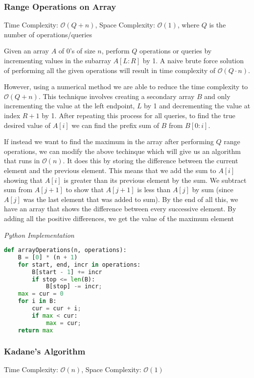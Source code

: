 \documentclass{article}
\newcommand{\bigO}{\ensuremath{\mathcal{O}}}
\begin{document}
    \subsubsection{Range Operations on Array}
    Time Complexity: $\bigO(Q + n)$, Space Complexity: $\bigO(1)$, where $Q$ is the number of operations/queries
    
    Given an array $A$ of 0's of size $n$, perform $Q$ operations or queries by incrementing values in the subarray $A[L: R]$ by 1. A naive brute force solution of performing all the given operations will result in time complexity of $\bigO(Q\cdot n)$. 
    
    However, using a numerical method we are able to reduce the time complexity to $\bigO(Q + n)$. This technique involves creating a secondary array $B$ and only incrementing the value at the left endpoint, $L$ by 1 and decrementing the value at index $R + 1$ by 1. After repeating this process for all queries, to find the true desired value of $A[i]$ we can find the prefix sum of $B$ from $B[0:i]$.
    
    If instead we want to find the maximum in the array after performing $Q$ range operations, we can modify the above techinque which will give us an algorithm that runs in $\bigO(n)$. It does this by storing the difference between the current element and the previous element. This means that we add the sum to $A[i]$ showing that $A[i]$ is greater than its previous element by the sum. We subtract sum from $A[j+1]$ to show that $A[j+1]$ is less than $A[j]$ by sum (since $A[j]$ was the last element that was added to sum). By the end of all this, we have an array that shows the difference between every successive element. By adding all the positive differences, we get the value of the maximum element
    
\vspace{8pt} \emph{Python Implementation}
\begin{lstlisting}[language=Python]
def arrayOperations(n, operations):
    B = [0] * (n + 1)
    for start, end, incr in operations:
        B[start - 1] += incr
        if stop <= len(B):
            B[stop] -= incr;
    max = cur = 0
    for i in B:
        cur = cur + i;
        if max < cur: 
            max = cur;
    return max
\end{lstlisting}
    
    
    \subsubsection{Kadane's Algorithm}
    Time Complexity: $\bigO(n)$, Space Complexity: $\bigO(1)$
    
\end{document}

